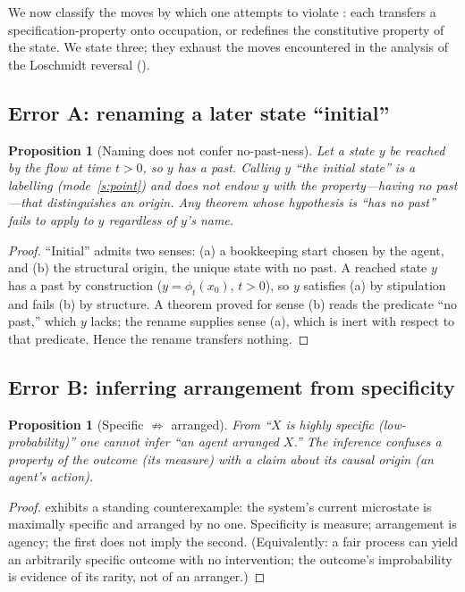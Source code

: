 \documentclass[11pt,a4paper]{article}
\theoremstyle{thmstyle}
\newtheorem{proposition}[theorem]{Proposition}
\theoremstyle{definition}
\theoremstyle{remark}
\begin{document}
We now classify the moves by which one attempts to violate :
each transfers a specification-property onto occupation, or redefines the
constitutive property of the state. We state three; they exhaust the moves
encountered in the analysis of the Loschmidt reversal ().

\subsection{Error A: renaming a later state ``initial''}

\begin{proposition}[Naming does not confer no-past-ness]
\label{prop:err-rename}
Let a state $y$ be reached by the flow at time $t>0$, so $y$ has a past. Calling
$y$ ``the initial state'' is a labelling (mode~\ref{s:point}) and does not endow
$y$ with the property---having no past---that distinguishes an origin. Any
theorem whose hypothesis is ``has no past'' fails to apply to $y$ regardless of
$y$'s name.
\end{proposition}

\begin{proof}
``Initial'' admits two senses: (a) a bookkeeping start chosen by the agent, and
(b) the structural origin, the unique state with no past. A reached state $y$ has
a past by construction ($y=\phi_t(x_0)$, $t>0$), so $y$ satisfies (a) by
stipulation and fails (b) by structure. A theorem proved for sense (b) reads the
predicate ``no past,'' which $y$ lacks; the rename supplies sense (a), which is
inert with respect to that predicate. Hence the rename transfers nothing.
\end{proof}

\subsection{Error B: inferring arrangement from specificity}

\begin{proposition}[Specific $\nRightarrow$ arranged]
\label{prop:err-arrange}
From ``$X$ is highly specific (low-probability)'' one cannot infer ``an agent
arranged $X$.'' The inference confuses a property of the outcome (its measure)
with a claim about its causal origin (an agent's action).
\end{proposition}

\begin{proof}
 exhibits a standing counterexample: the system's current
microstate is maximally specific and arranged by no one. Specificity is measure;
arrangement is agency; the first does not imply the second. (Equivalently: a fair
process can yield an arbitrarily specific outcome with no intervention; the
outcome's improbability is evidence of its rarity, not of an arranger.)
\end{proof}
\end{document}
